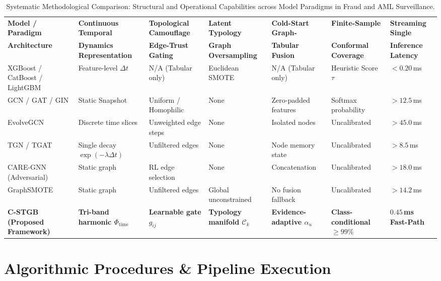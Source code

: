 \documentclass[a4paper,fleqn,twocolumn]{article}
\begin{document}
\begin{table}[t]
\centering
\footnotesize
\setlength{\tabcolsep}{2.5pt}
\caption{Systematic Methodological Comparison: Structural and Operational Capabilities across Model Paradigms in Fraud and AML Surveillance.}
\label{tab:methodological_comparison}
\begin{tabularx}{\textwidth}{lXXXXXX}
\toprule
\textbf{Model / Paradigm} & \textbf{Continuous Temporal} & \textbf{Topological Camouflage} & \textbf{Latent Typology} & \textbf{Cold-Start Graph-} & \textbf{Finite-Sample} & \textbf{Streaming Single} \\
\textbf{Architecture} & \textbf{Dynamics Representation} & \textbf{Edge-Trust Gating} & \textbf{Graph Oversampling} & \textbf{Tabular Fusion} & \textbf{Conformal Coverage} & \textbf{Inference Latency} \\
\midrule
XGBoost / CatBoost / LightGBM & Feature-level $\Delta t$ & N/A (Tabular only) & Euclidean SMOTE & N/A (Tabular only) & Heuristic Score $\tau$ & $<0.20$\,ms \\
GCN / GAT / GIN & Static Snapshot & Uniform / Homophilic & None & Zero-padded features & Softmax probability & $>12.5$\,ms \\
EvolveGCN & Discrete time slices & Unweighted edge steps & None & Isolated nodes & Uncalibrated & $>45.0$\,ms \\
TGN / TGAT & Single decay $\exp(-\lambda \Delta t)$ & Unfiltered edges & None & Node memory state & Uncalibrated & $>8.5$\,ms \\
CARE-GNN (Adversarial) & Static graph & RL edge selection & None & Concatenation & Uncalibrated & $>18.0$\,ms \\
GraphSMOTE & Static graph & Unfiltered edges & Global unconstrained & No fusion fallback & Uncalibrated & $>14.2$\,ms \\
\midrule
\textbf{C-STGB (Proposed Framework)} & \textbf{Tri-band harmonic $\Phi_{\text{time}}$} & \textbf{Learnable gate $\hat{g}_{ij}$} & \textbf{Typology manifold $\mathcal{C}_k$} & \textbf{Evidence-adaptive $\alpha_u$} & \textbf{Class-conditional $\ge 99\%$} & $\mathbf{0.45}$\,\textbf{ms Fast-Path} \\
\bottomrule
\end{tabularx}
\end{table}

\section{Algorithmic Procedures \& Pipeline Execution}
\label{sec:algorithms}
\end{document}
